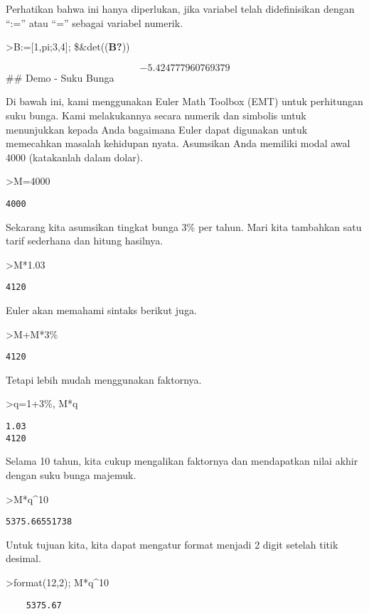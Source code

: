 \documentclass[
]{book}
\begin{document}
Perhatikan bahwa ini hanya diperlukan, jika variabel telah didefinisikan dengan ``:='' atau ``='' sebagai variabel numerik.

\textgreater B:={[}1,pi;3,4{]}; \$\&det((\textbf{B?}))

\[-5.424777960769379\]\#\# Demo - Suku Bunga

Di bawah ini, kami menggunakan Euler Math Toolbox (EMT) untuk perhitungan suku bunga. Kami melakukannya secara numerik dan simbolis untuk menunjukkan kepada Anda bagaimana Euler dapat digunakan untuk memecahkan masalah kehidupan nyata. Asumsikan Anda memiliki modal awal 4000 (katakanlah dalam dolar).

\textgreater M=4000

\begin{verbatim}
4000
\end{verbatim}

Sekarang kita asumsikan tingkat bunga 3\% per tahun. Mari kita tambahkan satu tarif sederhana dan hitung hasilnya.

\textgreater M*1.03

\begin{verbatim}
4120
\end{verbatim}

Euler akan memahami sintaks berikut juga.

\textgreater M+M*3\%

\begin{verbatim}
4120
\end{verbatim}

Tetapi lebih mudah menggunakan faktornya.

\textgreater q=1+3\%, M*q

\begin{verbatim}
1.03
4120
\end{verbatim}

Selama 10 tahun, kita cukup mengalikan faktornya dan mendapatkan nilai akhir dengan suku bunga majemuk.

\textgreater M*q\^{}10

\begin{verbatim}
5375.66551738
\end{verbatim}

Untuk tujuan kita, kita dapat mengatur format menjadi 2 digit setelah titik desimal.

\textgreater format(12,2); M*q\^{}10

\begin{verbatim}
    5375.67 
\end{verbatim}
\end{document}
